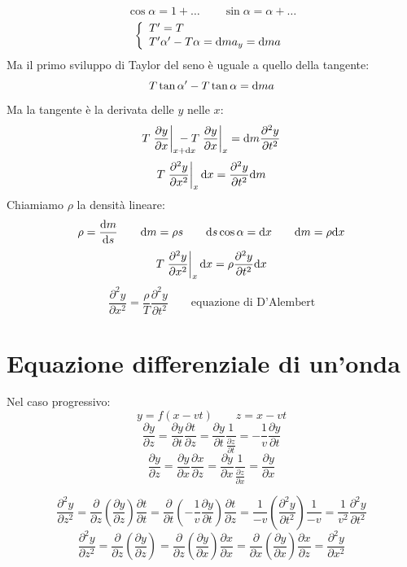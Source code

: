 $$\cos \alpha=1+\ldots\qquad \sin \alpha=\alpha+\ldots$$
$$\left\{\begin{array}{l}
T'=T\\
T'\alpha'-T\alpha=\mathrm{d} m a_y=\mathrm{d} m a\\
\end{array}\right.$$
Ma il primo sviluppo di Taylor del seno è uguale a quello della tangente:
$$T\tan\alpha'-T\tan\alpha=\mathrm{d} m a$$
Ma la tangente è la derivata delle $y$ nelle $x$:
$$T\left.\frac{\partial y}{\partial x}\right |_{x+\ud x}\!\!\!\!\!\!\!\!\!\!-T\left.\frac{\partial y}{\partial x}\right|_{x}=\ud m\frac{\partial^2 y}{\partial t^2}$$
$$T\left.\frac{\partial^2 y}{\partial x^2}\right|_x\mathrm{d} x=\frac{\partial^2 y}{\partial t^2}\mathrm{d} m$$
Chiamiamo $\rho$ la densità lineare:
$$\rho=\frac{\mathrm{d} m}{\mathrm{d} s}\qquad \mathrm{d} m=\rho s\qquad \mathrm{d} s\cos\alpha=\mathrm{d} x\qquad\mathrm{d} m=\rho\mathrm{d} x$$
$$T\left.\frac{\partial^2 y}{\partial x^2}\right|_x\mathrm{d} x=\rho\frac{\partial^2 y}{\partial t^2}\mathrm{d} x$$
$$\frac{\partial^2 y}{\partial x^2}=\frac{\rho}{T}\frac{\partial^2 y}{\partial t^2}\qquad\text{equazione di D'Alembert}$$

\parbox[]{\textwidth}{
\section{Equazione differenziale di un'onda}
Nel caso progressivo:
$$y=f(x-vt)\qquad z=x-vt$$
$$\frac{\partial y}{\partial z}=\frac{\partial y}{\partial t}\frac{\partial t}{\partial z}=\frac{\partial y}{\partial t}\frac{1}{\frac{\partial z}{\partial t}}=-\frac{1}{v}\frac{\partial y}{\partial t}$$
$$\frac{\partial y}{\partial z}=\frac{\partial y}{\partial x}\frac{\partial x}{\partial z}=\frac{\partial y}{\partial x}\frac{1}{\frac{\partial z}{\partial x}}=\frac{\partial y}{\partial x}$$
}

$$\frac{\partial^2 y}{\partial z^2}=\frac{\partial}{\partial z}\left(\frac{\partial y}{\partial z}\right)\frac{\partial t}{\partial t}=\frac{\partial}{\partial t}\left(-\frac{1}{v}\frac{\partial y}{\partial t}\right)\frac{\partial t}{\partial z}=\frac{1}{-v}\left(\frac{\partial^2 y}{\partial t^2}\right)\frac{1}{-v}=\frac{1}{v^2}\frac{\partial^2 y}{\partial t^2}$$
$$\frac{\partial^2 y}{\partial z^2}=\frac{\partial}{\partial z}\left(\frac{\partial y}{\partial z}\right)=\frac{\partial}{\partial z}\left(\frac{\partial y}{\partial x}\right)\frac{\partial x}{\partial x}=\frac{\partial}{\partial x}\left(\frac{\partial y}{\partial x}\right)\frac{\partial x}{\partial z}=\frac{\partial^2 y}{\partial x^2}$$

